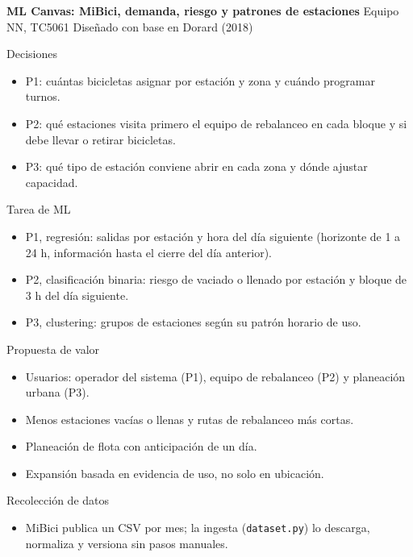 \documentclass[10pt]{article}
\begin{document}
{\Large\bfseries\color{tit} ML Canvas: MiBici, demanda, riesgo y patrones de estaciones}\hfill
{\small Equipo NN, TC5061 \quad Diseñado con base en Dorard (2018)}\par\vspace{3pt}
\begin{tcbraster}[raster columns=5,raster equal height=rows,raster column skip=3pt,raster row skip=3pt]
\begin{celda}[a]{Decisiones}
\begin{itemize}
\item P1: cuántas bicicletas asignar por estación y zona y cuándo programar turnos.
\item P2: qué estaciones visita primero el equipo de rebalanceo en cada bloque y si debe llevar o retirar bicicletas.
\item P3: qué tipo de estación conviene abrir en cada zona y dónde ajustar capacidad.
\end{itemize}
\end{celda}
\begin{celda}[a]{Tarea de ML}
\begin{itemize}
\item P1, regresión: salidas por estación y hora del día siguiente (horizonte de 1 a 24 h, información hasta el cierre del día anterior).
\item P2, clasificación binaria: riesgo de vaciado o llenado por estación y bloque de 3 h del día siguiente.
\item P3, clustering: grupos de estaciones según su patrón horario de uso.
\end{itemize}
\end{celda}
\begin{celda}[a]{Propuesta de valor}
\begin{itemize}
\item Usuarios: operador del sistema (P1), equipo de rebalanceo (P2) y planeación urbana (P3).
\item Menos estaciones vacías o llenas y rutas de rebalanceo más cortas.
\item Planeación de flota con anticipación de un día.
\item Expansión basada en evidencia de uso, no solo en ubicación.
\end{itemize}
\end{celda}
\begin{celda}[a]{Recolección de datos}
\begin{itemize}
\item MiBici publica un CSV por mes; la ingesta (\texttt{dataset.py}) lo descarga, normaliza y versiona sin pasos manuales.

\end{itemize}
\end{celda}
\end{tcbraster}
\end{document}
